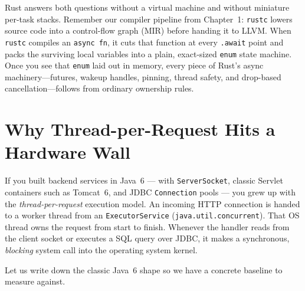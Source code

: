 Rust answers both questions without a virtual machine and without miniature per-task stacks. Remember our compiler pipeline from Chapter~1: \texttt{rustc} lowers source code into a control-flow graph (MIR) before handing it to LLVM. When \texttt{rustc} compiles an \texttt{async fn}, it cuts that function at every \texttt{.await} point and packs the surviving local variables into a plain, exact-sized \texttt{enum} state machine. Once you see that \texttt{enum} laid out in memory, every piece of Rust's async machinery---futures, wakeup handles, pinning, thread safety, and drop-based cancellation---follows from ordinary ownership rules.

\chapterline

\section{Why Thread-per-Request Hits a Hardware Wall}
\label{ch12:threads-vs-epoll}

If you built backend services in Java~6 --- with \texttt{ServerSocket}, classic Servlet containers such as Tomcat~6, and JDBC \texttt{Connection} pools --- you grew up with the \emph{thread-per-request} execution model. An incoming HTTP connection is handed to a worker thread from an \texttt{ExecutorService} (\texttt{java.util.concurrent}). That OS thread owns the request from start to finish. Whenever the handler reads from the client socket or executes a SQL query over JDBC, it makes a synchronous, \emph{blocking} system call into the operating system kernel.

Let us write down the classic Java~6 shape so we have a concrete baseline to measure against.

